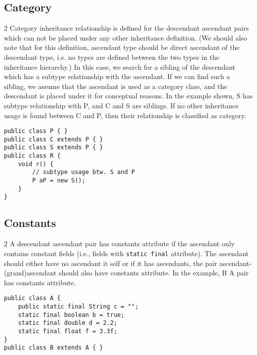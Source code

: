 \documentclass{uvamscse}
\begin{document}
\subsection{Category}
\begin{multicols} {2}
Category inheritance relationship is defined for the descendant ascendant pairs which can not be placed under any other inheritance definition. (We should also note that for this definition, ascendant type should be direct ascendant of the descendant type, i.e. no types are defined between the two types in the inheritance hierarchy.) In this case, we search for a sibling of the descendant which has a subtype relationship with the ascendant. If we can find such a sibling, we assume that the ascendant is used as a category class, and the descendant is placed under it for conceptual reasons. In the example shown, S has subtype relationship with P, and C and S are siblings. If no other inheritance usage is found between C and P, then their relationship is classified as category. 
\columnbreak
\begin{verbatim}
public class P { }
public class C extends P { }
public class S extends P { }
public class R {
    void r() {
    	// subtype usage btw. S and P
        P aP = new S();  
    }          
}
\end{verbatim}
\end{multicols}
       
\subsection{Constants}
\begin{multicols} {2}
A descendant ascendant pair has constants attribute if the ascendant only contains constant fields (i.e., fields with \texttt{static final} attribute). The ascendant should either have no ascendant it self or if it has ascendants, the pair ascendant-(grand)ascendant should also have constants attribute. In the example, B A pair has constants attribute.
\columnbreak
\begin{verbatim}
public class A {
    public static final String c = ""; 
    static final boolean b = true;		
    static final double d = 2.2;		
    static final float f = 3.3f;		
}
public class B extends A { }
\end{verbatim}
\end{multicols}
\end{document}
